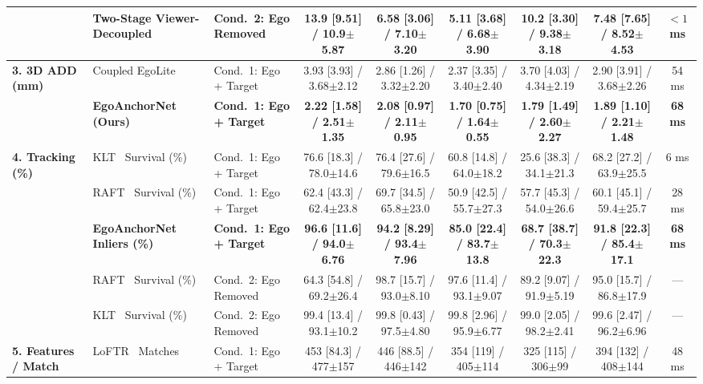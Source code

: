 \documentclass[journal]{IEEEtran}
\begin{document}
\begin{table}[!t]
{\begin{tabular}{lllcccccc}
 & \textbf{Two-Stage Viewer-Decoupled} & \textbf{Cond.~2: Ego Removed} & \textbf{13.9 [9.51] / 10.9$\pm$5.87} & \textbf{6.58 [3.06] / 7.10$\pm$3.20} & \textbf{5.11 [3.68] / 6.68$\pm$3.90} & \textbf{10.2 [3.30] / 9.38$\pm$3.18} & \textbf{7.48 [7.65] / 8.52$\pm$4.53} & \textbf{$<1$ ms} \\
\midrule
\multirow{2}{*}{\textbf{3. 3D ADD (mm)}} 
 & Coupled EgoLite & Cond.~1: Ego + Target & 3.93 [3.93] / 3.68$\pm$2.12 & 2.86 [1.26] / 3.32$\pm$2.20 & 2.37 [3.35] / 3.40$\pm$2.40 & 3.70 [4.03] / 4.34$\pm$2.19 & 2.90 [3.91] / 3.68$\pm$2.26 & 54 ms \\
 & \textbf{EgoAnchorNet (Ours)} & \textbf{Cond.~1: Ego + Target} & \textbf{2.22 [1.58] / 2.51$\pm$1.35} & \textbf{2.08 [0.97] / 2.11$\pm$0.95} & \textbf{1.70 [0.75] / 1.64$\pm$0.55} & \textbf{1.79 [1.49] / 2.60$\pm$2.27} & \textbf{1.89 [1.10] / 2.21$\pm$1.48} & \textbf{68 ms} \\
\midrule
\multirow{5}{*}{\textbf{4. Tracking (\%)}} 
 & KLT~\cite{lucas1981iterative} Survival (\%) & Cond.~1: Ego + Target & 76.6 [18.3] / 78.0$\pm$14.6 & 76.4 [27.6] / 79.6$\pm$16.5 & 60.8 [14.8] / 64.0$\pm$18.2 & 25.6 [38.3] / 34.1$\pm$21.3 & 68.2 [27.2] / 63.9$\pm$25.5 & 6 ms \\
 & RAFT~\cite{teed2020raft} Survival (\%) & Cond.~1: Ego + Target & 62.4 [43.3] / 62.4$\pm$23.8 & 69.7 [34.5] / 65.8$\pm$23.0 & 50.9 [42.5] / 55.7$\pm$27.3 & 57.7 [45.3] / 54.0$\pm$26.6 & 60.1 [45.1] / 59.4$\pm$25.7 & 28 ms \\
 & \textbf{EgoAnchorNet Inliers (\%)} & \textbf{Cond.~1: Ego + Target} & \textbf{96.6 [11.6] / 94.0$\pm$6.76} & \textbf{94.2 [8.29] / 93.4$\pm$7.96} & \textbf{85.0 [22.4] / 83.7$\pm$13.8} & \textbf{68.7 [38.7] / 70.3$\pm$22.3} & \textbf{91.8 [22.3] / 85.4$\pm$17.1} & \textbf{68 ms} \\
 & RAFT~\cite{teed2020raft} Survival (\%) & Cond.~2: Ego Removed & 64.3 [54.8] / 69.2$\pm$26.4 & 98.7 [15.7] / 93.0$\pm$8.10 & 97.6 [11.4] / 93.1$\pm$9.07 & 89.2 [9.07] / 91.9$\pm$5.19 & 95.0 [15.7] / 86.8$\pm$17.9 & --- \\
 & KLT~\cite{lucas1981iterative} Survival (\%) & Cond.~2: Ego Removed & 99.4 [13.4] / 93.1$\pm$10.2 & 99.8 [0.43] / 97.5$\pm$4.80 & 99.8 [2.96] / 95.9$\pm$6.77 & 99.0 [2.05] / 98.2$\pm$2.41 & 99.6 [2.47] / 96.2$\pm$6.96 & --- \\
\midrule
\multirow{6}{*}{\textbf{5. Features / Match}} 
 & LoFTR~\cite{sun2021loftr} Matches & Cond.~1: Ego + Target & 453 [84.3] / 477$\pm$157 & 446 [88.5] / 446$\pm$142 & 354 [119] / 405$\pm$114 & 325 [115] / 306$\pm$99 & 394 [132] / 408$\pm$144 & 48 ms \\

\end{tabular}}
\end{table}
\end{document}
